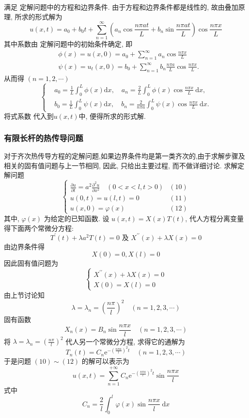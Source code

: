 满足 定解问题中的方程和边界条件. 由于方程和边界条件都是线性的, 故由叠加原理, 所求的形式解为
$$
u(x, t)=a_{0}+b_{0} t+\sum_{n=1}^{\infty}\left(a_{n} \cos \frac{n \pi a t}{L}+b_{n} \sin \frac{n \pi a t}{L}\right) \cos \frac{n \pi x}{L}
$$
其中系数由 定解问题中的初始条件确定, 即
$$
\begin{aligned}
&\phi(x)=u(x, 0)=a_{0}+\sum_{n=1}^{\infty} a_{n} \cos \frac{n \pi x}{L} \\
&\psi(x)=u_{t}(x, 0)=b_{0}+\sum_{n=1}^{\infty} b_{n} \frac{n \pi a}{L} \cos \frac{n \pi x}{L} .
\end{aligned}
$$
从而得 $ (n=1,2, \cdots) $
$$
\left\{\begin{aligned}
&a_{0}=\frac{1}{L} \int_{0}^{L} \phi(x) \mathrm{d} x, \quad a_{n}=\frac{2}{L} \int_{0}^{L} \phi(x) \cos \frac{n \pi x}{L} \mathrm{~d} x, \\
&b_{0}=\frac{1}{L} \int_{0}^{L} \psi(x) \mathrm{d} x, \quad b_{n}=\frac{2}{n \pi a} \int_{0}^{L} \psi(x) \cos \frac{n \pi x}{L} \mathrm{~d} x .
\end{aligned}\right.
$$
将式系数 代入到$u(x,t)$中, 便得所求的形式解.



\subsubsection{有限长杆的热传导问题}
对于齐次热传导方程的定解问题,如果边界条件均是第一类齐次的,由于求解步骤及相关的固有值问题与上一节相同, 因此, 只给出主要过程, 而不做详细讨论.
求解定解问题
$$
\left.\left\{\begin{array}{ll}
\frac{\partial u}{\partial t}=a^{2} \frac{\partial^{2} u}{\partial x^{2}} \quad(0<x<l, t>0) &(10) \\
u(0, t)=u(l, t)=0 &(11)\\
u(x, 0)=\varphi(x)&(12)
\end{array}\right.\right.
$$
其中, $ \varphi(x) $ 为给定的已知函数.
设 $ u(x, t)=X(x) T(t) $, 代人方程分离变量得下面两个常微分方程:
$$
T^{\prime}(t)+\lambda a^{2} T(t)=0 \text { 及 } X^{\prime \prime}(x)+\lambda X(x)=0
$$
由边界条件得
$$
X(0)=0, X(l)=0
$$
因此固有值问题为
$$
\left\{\begin{array}{l}
X^{\prime \prime}(x)+\lambda X(x)=0 \\
X(0)=X(l)=0
\end{array}\right.
$$
由上节讨论知
$$
\lambda=\lambda_{n}=\left(\frac{n \pi}{l}\right)^{2} \quad(n=1,2,3, \cdots)
$$
固有函数
$$
X_{n}(x)=B_{n} \sin \frac{n \pi x}{l} \quad(n=1,2,3, \cdots)
$$
将 $ \lambda=\lambda_{n}=\left(\frac{n \pi}{l}\right)^{2} $ 代人另一个常微分方程, 求得它的通解为
$$
T_{n}(t)=C_{n} \mathrm{e}^{-\left(\frac{n \pi a}{l}\right)^{2} t} \quad(n=1,2,3, \cdots)
$$
于是问题 $(10)\sim(12)$ 的解可以表示为
$$
u(x, t)=\sum_{n=1}^{+\infty} C_{n} \mathrm{e}^{-\left(\frac{n \pi a}{l}\right)^{2} t} \sin \frac{n \pi x}{l}
$$
式中
$$
C_{n}=\frac{2}{l} \int_{0}^{l} \varphi(x) \sin \frac{n \pi x}{l} \mathrm{~d} x
$$

